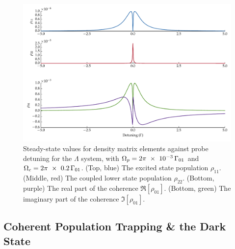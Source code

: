     \begin{figure}[h]
      \includegraphics[width=\linewidth]
        {figs/04_polaritons/steady_scan_p000_1_c0_2_fig1.pdf}
      \caption{
      Steady-state values for density matrix elements against probe detuning for
      the $\Lambda$ system, with $\Omega_p =
      \unit[2\pi~\times~10^{-3}]{\Gamma_{01}}$ and $\Omega_c =
      \unit[2\pi~\times~0.2]{\Gamma_{01}}$. (Top, blue) The excited state
      population $\rho_{11}$. (Middle, red) The coupled lower state population
      $\rho_{22}$. (Bottom, purple) The real part of the coherence  $\Re \left[
      \rho_{01} \right]$. (Bottom, green) The imaginary part of the coherence
      $\Im \left[ \rho_{01} \right]$.
      }
      \label{fig:autler_townes_narrow}
    \end{figure}

  \subsection{Coherent Population Trapping \& the Dark State}

